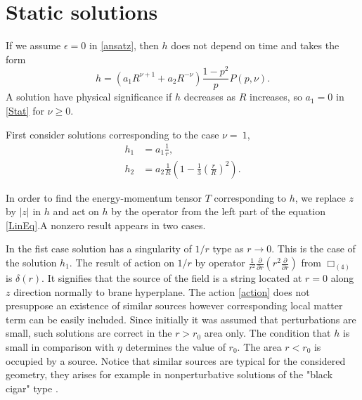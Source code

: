\documentclass[letterpaper,12pt]{article}
\begin{document}
 \section{Static solutions}\label{static}
If  we assume $\epsilon=0$ in \eqref{ansatz}, then $h$ does not
depend on time and takes the form
\begin {equation}
\label{Stat}
 h=\left(a_1R^{\nu+1}+a_2R^{-\nu}\right)\frac{1-p^2}{p}P(p,\nu).
\end{equation}
A solution have physical significance if $h$ decreases as $R$
increases, so  $a_1=0$ in \eqref{Stat} for $\nu\geq 0$.

First consider solutions corresponding to the case $\nu=~1$,
\begin{align}
\label{h1(nu=1)}
 h_1&=a_1\frac{1}{r},\\
 \label{h2(nu=1)}
 h_2&=a_2\frac{1}{R}\left(1-\frac{1}{3}\left(\frac{r}{R}\right)^2\right).
\end{align}

In order to find the energy-momentum tensor $T$ corresponding to
$h$, we replace  $z$ by $|z|$ in  $h$ and  act on  $h$ by the
operator from the left part of the equation \eqref{LinEq}.A
nonzero result appears in two cases.

In the fist case solution has a singularity of $1/r$ type as
$r\rightarrow 0$. This is the case of the solution $h_1$. The
result of action on $1/r$ by operator $\frac{1}{r^2}\frac{\partial
}{\partial r}\left(r^2\frac{\partial }{\partial r}\right)$ from
$\Box_{(4)}$ is $\delta(r)$. It signifies that the source of the
field is a string located at $r=0$ along  $z$  direction normally
to brane hyperplane.  The action \eqref{action} does not
presuppose an existence of similar sources however corresponding
local matter term can be easily included. Since initially it was
assumed that perturbations are small, such solutions are correct
in the $r>r_0$ area only. The condition that $h$ is small in
comparison with $\eta$ determines the value of $r_0$. The area
$r<r_0$ is occupied by a source. Notice that similar sources are
typical for the considered geometry, they arises for example  in
nonperturbative solutions of the "black cigar" type
\cite{Chamblin99}.
\end{document}
